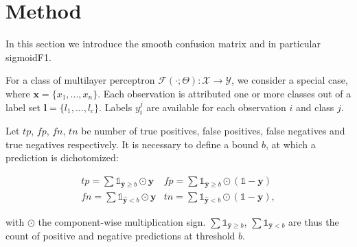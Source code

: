 
\section{Method}
\label{sec:orga8a42f5}

In this section we introduce the smooth confusion matrix and in particular sigmoidF1. 

For a class of multilayer perceptron \(\mathcal{F}(\cdot ; \Theta): \mathcal{X} \rightarrow \mathcal{Y}\), we consider a special case, where \(\mathbf{x} = \{x_1, ..., x_n\}\). Each observation is attributed one or more classes out of a label set \(\mathbf{l} = \{l_1, ..., l_c\}\). Labels \(y_{i}^{j}\) are available for each observation \(i\) and class \(j\). 




Let \(tp\), \(fp\), \(fn\), \(tn\) be number of true positives, false positives, false negatives and true negatives respectively. It is necessary to define a bound \(b\), at which a prediction is dichotomized:

\begin{equation}
\label{eq:conf}
\begin{array}{ll} tp = \sum \mathds{1}_{\hat{\mathbf{y}} \geq b} \odot \mathbf{y}  & fp = \sum \mathds{1}_{\hat{\mathbf{y}} \geq b} \odot (\mathds{1} - \mathbf{y}) \\ fn = \sum \mathds{1}_{\hat{\mathbf{y}} < b} \odot \mathbf{y} & tn = \sum \mathds{1}_{\hat{\mathbf{y}} < b} \odot (\mathds{1} - \mathbf{y}),
\end{array}
\end{equation}

with \(\odot\) the component-wise multiplication sign. \(\sum \mathds{1}_{\hat{\mathbf{y}} \geq b}\), \(\sum \mathds{1}_{\hat{\mathbf{y}} < b}\) are thus the count of positive and negative predictions at threshold \(b\).

